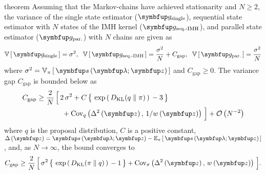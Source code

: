 
\begin{theoremEnd}{theorem}\label{thm:var}
  Assuming that the Markov-chains have achieved stationarity and \(N \geq 2\), the variance of the single state estimator (\(\vg_{\text{single}}\)), sequential state estimator with \(N\) states of the IMH kernel (\(\vg_{\text{seq.-IMH}}\)), and parallel state estimator (\(\vg_{\text{par.}}\)) with \(N\) chains are given as 
  \vspace{-0.08in}
  {\small
  \begin{align*}
    \V{\vg_{\text{single}}}   = \sigma^2,\;\;
    \V{\vg_{\text{seq.-IMH}}}  = \frac{\sigma^2}{N} + C_{\text{gap}},\;\;
    \V{\vg_{\text{par.}}}    = \frac{\sigma^2}{N}
  \end{align*}
  }%
  where \(\sigma^2 = \Vsub{\pi}{\vs\left(\vlambda; \vz\right)} \) and \(C_{\text{gap}} \geq 0\).
  The variance gap \(C_{\text{gap}}\) is bounded below as
  \vspace{-0.05in}
  {\small
  \begin{align*}
    C_{\text{gap}}
    \geq
    \frac{2}{N} \, \Big[\,
    &2\,\sigma^2
    +
    C \, \big\{\,
    \exp\,(\,
    \DKL{q}{\pi}
    \,)\,
    -
    3
    \,\big\}
    \\
    &\; +
    \text{Cov}_{q}\left(\Delta^2\left(\vz\right),\, 1/ w\left(\vz\right) \right)
    \,\Big]
    +
    \mathcal{O}\left(N^{-2}\right)
  \end{align*}
  }%
  where \(q\) is the proposal distribution, \(C\) is a positive constant, \(\Delta\left(\vz\right) = \vs\left(\vlambda;\vz\right) - \Esub{\pi}{\vs\left(\vlambda;\vz\right)}\),
  and, as \(N \rightarrow \infty\), the bound converges to
  \vspace{-0.05in}
  {\small
  \begin{align*}
    C_{\text{gap}}
    \geq
    \frac{2}{N} \, \Big[\,
    \sigma^2 \, \big\{\,
    \exp\,(\,
    \DKL{\pi}{q}
    \,)\,
    -
    1
    \,\big\}
     +
    \text{Cov}_{\pi}\left(\Delta^2\left(\vz\right),\, w\left(\vz\right) \right)
    \,\Big].
  \end{align*}
  }
\end{theoremEnd}
%
